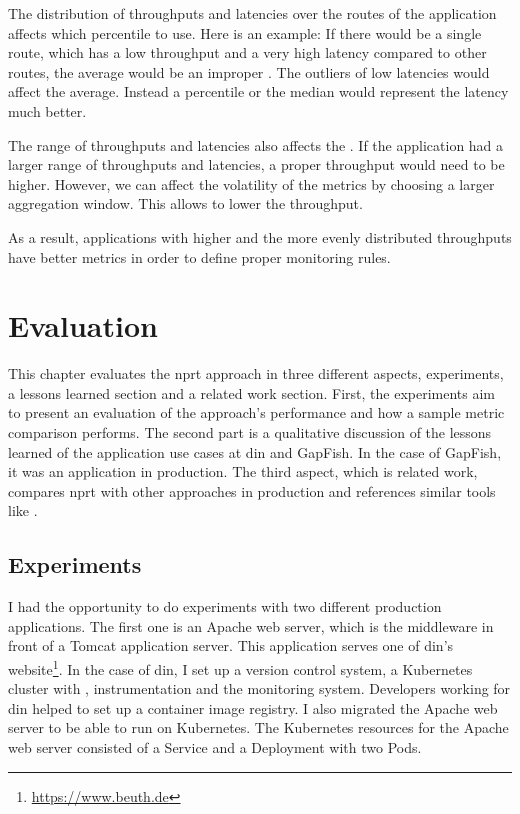 The distribution of throughputs and latencies over the routes of the application affects
which percentile to use. Here is an example: If there would be a single route, which has a
low throughput and a very high latency compared to other routes, the average would be an
improper . The outliers of low latencies would affect the
average. Instead a percentile or the median would represent the latency much better.

The range of throughputs and latencies also affects the . If the
application had a larger range of throughputs and latencies, a proper throughput would
need to be higher. However, we can affect the volatility of the metrics by choosing a larger
aggregation window. This allows to lower the throughput.

As a result, applications with higher and the more evenly distributed throughputs have
better metrics in order to define proper monitoring rules.

\chapter{Evaluation}
\label{chap:eval}

This chapter evaluates the \gls{nprt} approach in three different aspects, experiments, a
lessons learned section and a related work section. First, the experiments aim to
present an evaluation of the approach's performance and how a sample metric comparison performs. The second part is a qualitative
discussion of the lessons learned of the application use cases at \gls{din} and GapFish.
In the case of GapFish, it was an application in production. The third aspect, which is related work,
compares \gls{nprt} with other approaches in production and references similar tools like
\deployer{}.

\section{Experiments}

I had the opportunity to do experiments with two different production applications. The
first one is an Apache web server, which is the middleware in front of a Tomcat
application server. This application serves one of \gls{din}'s
website\footnote{\url{https://www.beuth.de}}. In the case of \gls{din}, I set up a version
control system, a Kubernetes cluster with \deployer{}, instrumentation and the monitoring
system. Developers working for \gls{din} helped to set up a container image
registry. I also migrated the Apache web server to be able to run on Kubernetes. The
Kubernetes resources for the Apache web server consisted of a Service and a Deployment
with two Pods.

